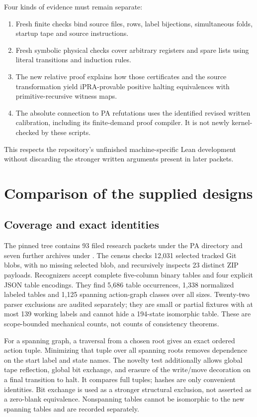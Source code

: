 \documentclass[10pt,letterpaper]{article}
\newcommand{\file}[1]{\path{#1}}
\begin{document}
Four kinds of evidence must remain separate:
\begin{enumerate}
\item Fresh finite checks bind source files, rows, label bijections,
      simultaneous folds, startup tape and source instructions.
\item Fresh symbolic physical checks cover arbitrary registers and
      spare lists using literal transitions and induction rules.
\item The new relative proof explains how those certificates and the
      source transformation yield iPRA-provable positive halting
      equivalences with primitive-recursive witness maps.
\item The absolute connection to PA refutations uses the identified
      revised written calibration, including its finite-demand proof
      compiler.  It is not newly kernel-checked by these scripts.
\end{enumerate}
This respects the repository's unfinished machine-specific Lean
development without discarding the stronger written arguments present
in later packets.

\section{Comparison of the supplied designs}
\label{sec:comparison}

\subsection{Coverage and exact identities}

The pinned tree contains 93 filed research packets under the PA
\file{docs/} directory and seven further archives under
\file{docs/incoming}.
The census checks 12,031 selected tracked Git blobs, with no missing
selected blob, and recursively inspects 23 distinct ZIP payloads.
Recognizers accept complete five-column binary tables and four explicit
JSON table encodings.  They find 5,686 table occurrences, 1,338
normalized labeled tables and 1,125 spanning action-graph classes
over all sizes.  Twenty-two parser exclusions are audited separately;
they are small or partial fixtures with at most 139 working labels and
cannot hide a 194-state isomorphic table.  These are scope-bounded
mechanical counts, not counts of consistency theorems.

For a spanning graph, a traversal from a chosen root gives an exact
ordered action tuple.  Minimizing that tuple over all spanning roots
removes dependence on the start label and state names.  The novelty
test additionally allows global tape reflection, global bit exchange,
and erasure of the write/move decoration on a final transition to halt.
It compares full tuples; hashes are only convenient identities.
Bit exchange is used as a stronger structural exclusion, not asserted
as a zero-blank equivalence.  Nonspanning tables cannot be isomorphic
to the new spanning tables and are recorded separately.
\end{document}
